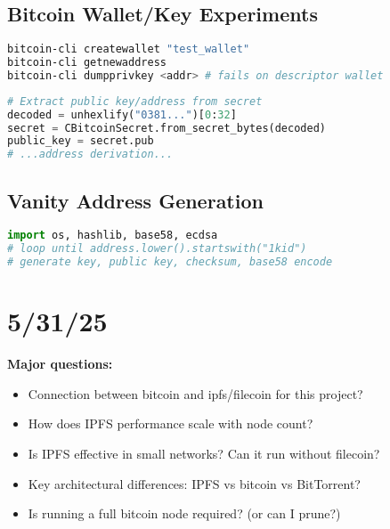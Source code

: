 \documentclass{article}
\begin{document}
\subsection*{Bitcoin Wallet/Key Experiments}
\begin{lstlisting}[language=bash]
bitcoin-cli createwallet "test_wallet"
bitcoin-cli getnewaddress
bitcoin-cli dumpprivkey <addr> # fails on descriptor wallet
\end{lstlisting}
\begin{lstlisting}[language=Python]
# Extract public key/address from secret
decoded = unhexlify("0381...")[0:32]
secret = CBitcoinSecret.from_secret_bytes(decoded)
public_key = secret.pub
# ...address derivation...
\end{lstlisting}

\subsection*{Vanity Address Generation}
\begin{lstlisting}[language=Python]
import os, hashlib, base58, ecdsa
# loop until address.lower().startswith("1kid")
# generate key, public key, checksum, base58 encode
\end{lstlisting}

\section*{5/31/25}

\textbf{Major questions:}
\begin{itemize}
    \item Connection between bitcoin and ipfs/filecoin for this project?
    \item How does IPFS performance scale with node count?
    \item Is IPFS effective in small networks? Can it run without filecoin?
    \item Key architectural differences: IPFS vs bitcoin vs BitTorrent?
    \item Is running a full bitcoin node required? (or can I prune?)
\end{itemize}
\end{document}
